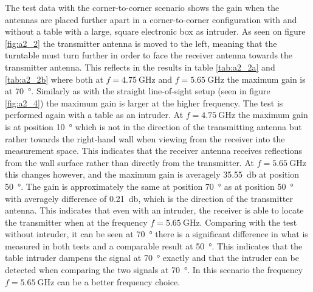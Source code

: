 The test data with the corner-to-corner scenario shows the gain when the antennas are placed further apart in a corner-to-corner configuration with and without a table with a large, square electronic box as intruder. As seen on figure \ref{fig:a2_2} the transmitter antenna is moved to the left, meaning that the turntable must turn further in order to face the receiver antenna towards the transmitter antenna. This reflects in the results in table \ref{tab:a2_2a} and \ref{tab:a2_2b} where both at $f=\SI{4.75}{\giga\hertz}$ and $f=\SI{5.65}{\giga\hertz}$ the maximum gain is at \SI{70}{\degree}. Similarly as with the straight line-of-sight setup (seen in figure \ref{fig:a2_4}) the maximum gain is larger at the higher frequency. The test is performed again with a table as an intruder. At $f=\SI{4.75}{\giga\hertz}$ the maximum gain is at position \SI{10}{\degree} which is not in the direction of the transmitting antenna but rather towards the right-hand wall when viewing from the receiver into the measurement space. This indicates that the receiver antenna receives reflections from the wall surface rather than directly from the transmitter. At $f=\SI{5.65}{\giga\hertz}$ this changes however, and the maximum gain is averagely \SI{35.55}{\decibel} at position \SI{50}{\degree}. The gain is approximately the same at position \SI{70}{\degree} as at position \SI{50}{\degree} with averagely difference of \SI{0.21}{\decibel}, which is the direction of the transmitter antenna. This indicates that even with an intruder, the receiver is able to locate the transmitter when at the frequency $f=\SI{5.65}{\giga\hertz}$. Comparing with the test without intruder, it can be seen at \SI{70}{\degree} there is a significant difference in what is measured in both tests and a comparable result at \SI{50}{\degree}. This indicates that the table intruder dampens the signal at \SI{70}{\degree} exactly and that the intruder can be detected when comparing the two signals at \SI{70}{\degree}. In this scenario the frequency $f=\SI{5.65}{\giga\hertz}$ can be a better frequency choice.

